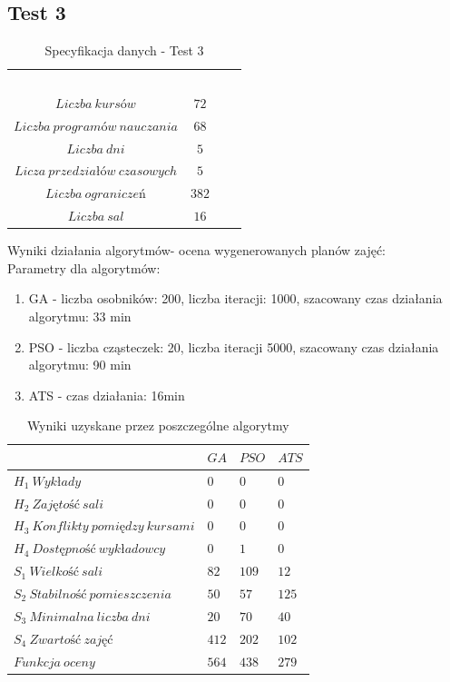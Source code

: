 \subsection{Test 3}
\begin{table}[H]
\begin{center}

\begin{tabular}{ |c|c|c|c| }
\multicolumn{1}{r}{}
 &  \multicolumn{1}{c}{$$}
 & \multicolumn{1}{c}{$$} 
 \\
\cline{1-2}
$Liczba\ kursów$ & $72$\\
\cline{1-2}
$Liczba\ programów\ nauczania$ & $68$\\
\cline{1-2}
$Liczba\ dni$ & $5$ \\
\cline{1-2}
$Licza\ przedziałów\ czasowych$ & $5$ \\
\cline{1-2}
$Liczba\ ograniczeń$ & $382$ \\
\cline{1-2}
$Liczba\ sal$ & $16$ \\
\cline{1-2}
\end{tabular}
\end{center}
\caption {Specyfikacja danych - Test 3}
\end{table}
\par Wyniki działania algorytmów- ocena wygenerowanych planów zajęć: \\
Parametry dla algorytmów:
\begin{enumerate}
\item GA - liczba osobników: 200, liczba iteracji: 1000, szacowany czas działania algorytmu: 33 min
\item PSO - liczba cząsteczek: 20, liczba iteracji 5000, szacowany czas działania algorytmu: 90 min
\item ATS - czas działania: 16min
\end{enumerate}
\begin{table}[H]
\begin{center}

\begin{tabular}{ |l|l|l|l| }
\hline
 & $GA$ & $PSO$ & $ATS$\\
\hline
${H}_{1}\ Wykłady$ & $0$ & $0$ & $0$\\
\hline
$H_{2}\ Zajętość\ sali$ & $0$ & $0$ & $0$\\
\hline
$H_{3}\ Konflikty\ pomiędzy\ kursami$ & $0$ & $0$ & $0$ \\
\hline
$H_{4}\ Dostępność\ wykładowcy$ & $0$ & $1$ & $0$ \\
\hline
$S_{1}\ Wielkość\ sali$ & $82$ & $109$ & $12$ \\
\hline
$S_{2}\ Stabilność\ pomieszczenia$ & $50$ & $57$ & $125$ \\
\hline
$S_{3}\ Minimalna\ liczba\ dni$ & $20$ & $70$ & $40$ \\
\hline
$S_{4}\ Zwartość\ zajęć$ & $412$ & $202$ & $102$ \\
\hline
$Funkcja\ oceny$ & $564$ & $438$ & $279$ \\
\hline
\end{tabular}
\end{center}
\caption {Wyniki uzyskane przez poszczególne algorytmy}
\end{table}
